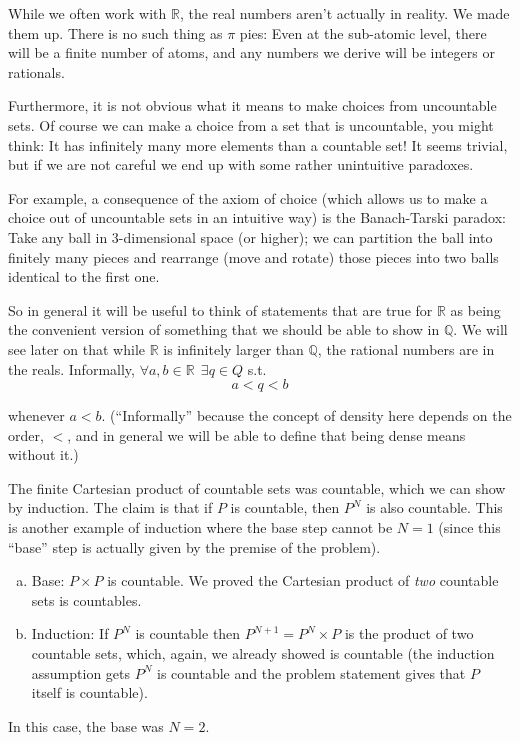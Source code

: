 \documentclass{article}
\begin{document}
\begin{tacomment}{1}
  While we often work with $\mathbb{R}$, the real numbers aren't actually in reality. We made them up. There is no such thing as $\pi$ pies: Even at the sub-atomic level, there will be a finite number of atoms, and any numbers we derive will be integers or rationals.

  Furthermore, it is not obvious what it means to make choices from uncountable sets.  Of course we can make a choice from a set that is uncountable, you might think: It has infinitely many more elements than a countable set! It seems trivial, but if we are not careful we end up with some rather unintuitive paradoxes.

  For example, a consequence of the axiom of choice (which allows us to make a choice out of uncountable sets in an intuitive way) is the Banach-Tarski paradox: Take any ball in 3-dimensional space (or higher); we can partition the ball into finitely many pieces and rearrange (move and rotate) those pieces into two balls identical to the first one.

  So in general it will be useful to think of statements that are true for $\mathbb{R}$ as being the convenient version of something that we should be able to show in $\mathbb{Q}$. We will see later on that while $\mathbb{R}$ is infinitely larger than $\mathbb{Q}$, the rational numbers are  in the reals. Informally, $\forall a, b \in \mathbb{R} ~~ \exists q \in Q$ s.t.
  \[
    a < q < b
  \]

  whenever $a < b$. (``Informally'' because the concept of density here depends on the order, $<$, and in general we will be able to define that being dense means without it.)
\end{tacomment}

\begin{remark}
  The finite Cartesian product of countable sets was countable, which we can show by induction. The claim is that if $P$ is countable, then $P^N$ is also countable. This is another example of induction where the base step cannot be $N = 1$ (since this ``base'' step is actually given by the premise of the problem).
  \begin{enumerate}[a)]
    \item Base: $P \times P$ is countable. We proved the Cartesian product of \textit{two} countable sets is countables.

    \item Induction: If $P^N$ is countable then $P^{N + 1} = P^N \times P$ is the product of two countable sets, which, again, we already showed is countable (the induction assumption gets $P^N$ is countable and the problem statement gives that $P$ itself is countable).
  \end{enumerate}

  In this case, the base was $N = 2$.
\end{remark}
\end{document}
